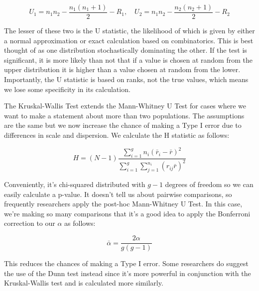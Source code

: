 \documentclass[12pt, letterpaper]{article} %
\begin{document}
\begin{equation}
    U_1 = n_1n_2 - \frac{n_1(n_1+1)}{2} - R_1, \quad U_2 = n_1n_2 - \frac{n_2(n_2+1)}{2} - R_2
\end{equation}

The lesser of these two is the U statistic, the likelihood of which is given by either a normal approximation or exact calculation based on combinatorics. This is best thought of as one distribution stochastically dominating the other. If the test is significant, it is more likely than not that if a value is chosen at random from the upper distribution it is higher than a value chosen at random from the lower. Importantly, the U statistic is based on ranks, not the true values, which means we lose some specificity in its calculation.

The Kruskal-Wallis Test extends the Mann-Whitney U Test for cases where we want to make a statement about more than two populations. The assumptions are the same but we now increase the chance of making a Type I error due to differences in scale and dispersion. We calculate the H statistic as follows:

\begin{equation}
    H = (N-1)\frac{\sum^g_{i = 1}n_i (\bar r_i - \bar r)^2}{\sum_{i=1}^g\sum_{j=1}^{n_i}(r_{ij}\bar r)^2}
\end{equation}

Conveniently, it's chi-squared distributed with $g-1$ degrees of freedom so we can easily calculate a p-value. It doesn't tell us about pairwise comparisons, so frequently researchers apply the post-hoc Mann-Whitney U Test. In this case, we're making so many comparisons that it's a good idea to apply the Bonferroni correction to our $\alpha$ as follows:

\begin{equation}
    \bar \alpha = \frac{2\alpha}{g(g-1)}
\end{equation}

This reduces the chances of making a Type I error. Some researchers do suggest the use of the Dunn test instead since it's more powerful in conjunction with the Kruskal-Wallis test and is calculated more similarly.

\nocite{*}

\printbibliography
\end{document}
